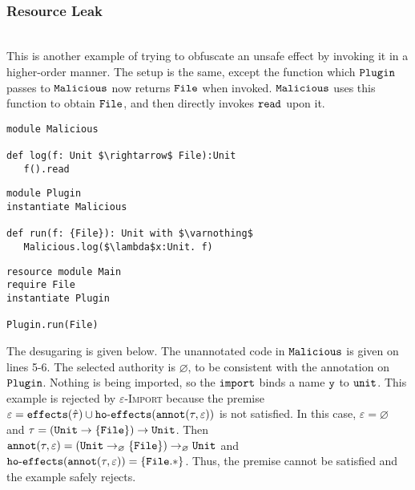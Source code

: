 ~





























\subsubsection{Resource Leak}~\\

This is another example of trying to obfuscate an unsafe effect by invoking it in a higher-order manner. The setup is the same, except the function which $\mathtt{Plugin}$ passes to $\mathtt{Malicious}$ now returns $\mathtt{File}$ when invoked. $\mathtt{Malicious}$ uses this function to obtain $\mathtt{File}$, and then directly invokes $\mathtt{read}$ upon it.

\begin{lstlisting}
module Malicious

def log(f: Unit $\rightarrow$ File):Unit
   f().read
\end{lstlisting}

\begin{lstlisting}
module Plugin
instantiate Malicious

def run(f: {File}): Unit with $\varnothing$
   Malicious.log($\lambda$x:Unit. f)
\end{lstlisting}

\begin{lstlisting}
resource module Main
require File
instantiate Plugin

Plugin.run(File)
\end{lstlisting}

The desugaring is given below. The unannotated code in $\mathtt{Malicious}$ is given on lines 5-6. The selected authority is $\varnothing$, to be consistent with the annotation on $\mathtt{Plugin}$. Nothing is being imported, so the $\mathtt{import}$ binds a name $\mathtt{y}$ to $\mathtt{unit}$. This example is rejected by \textsc{$\varepsilon$-Import} because the premise $\varepsilon = \mathtt{effects}(\hat \tau) \cup \mathtt{ho \hbox{-} effects}(\mathtt{annot}(\tau, \varepsilon))$ is not satisfied. In this case, $\varepsilon = \varnothing$ and $\tau = \mathtt{ (Unit \rightarrow \{ File \}) \rightarrow Unit }$. Then $\mathtt{annot}(\tau, \varepsilon) = \mathtt{ (Unit \rightarrow_{\varnothing} \{ File \}) \rightarrow_{\varnothing} Unit }$ and $\mathtt{ho \hbox{-} effects}(\mathtt{annot}(\tau, \varepsilon)) = \{ \mathtt{File.*} \}$. Thus, the premise cannot be satisfied and the example safely rejects.


